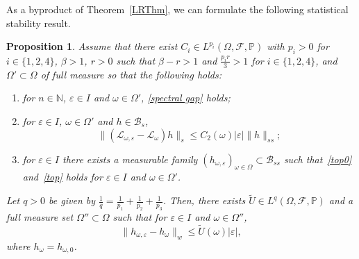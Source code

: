\documentclass[11pt,reqno,a4paper]{article}
\newtheorem{proposition}[theorem]{Proposition}
\theoremstyle{special}
\renewcommand{\epsilon}{\varepsilon}
\renewcommand{\L}{\mathcal{L}}
\def\N{\mathbb{N}}
\def\B{\mathcal{B}}
\begin{document}
$$
$$

As a byproduct of Theorem~\ref{LRThm}, we can formulate the following statistical stability result.
\begin{proposition}\label{Stab Prop}
Assume that there exist $C_i\in L^{p_i}(\Omega, \mathcal F, \mathbb P)$ with $p_i>0$ for $i\in \{ 1, 2,  4\}$,  $\beta >1$, $r>0$ such that $\beta -r>1$ and $\frac{p_ir}{3}>1$ for $i\in \{1, 2, 4\}$, and $\Omega'\subset \Omega$ of full measure so that the following holds:
\begin{enumerate}
\item for $n\in \N$, $\epsilon \in I$ and $\omega \in \Omega'$, \eqref{spectral gap} holds;
\item for $\epsilon \in I$, $\omega \in \Omega'$ and $h\in \B_{s}$, 
\begin{equation}\label{tn11}
\|(\L_{\omega, \epsilon}-\L_\omega)h\|_s \le C_2(\omega)|\epsilon| \|h\|_{ss};
\end{equation}
\item for $\epsilon \in I$ there exists a measurable family $(h_{\omega, \epsilon})_{\omega \in \Omega}\subset \B_{ss}$ such that~\eqref{top0} and~\eqref{top} holds for $\epsilon \in I$ and $\omega \in \Omega'$.
\end{enumerate}
Let $q>0$ be given by $\frac 1 q=\frac{1}{p_1}+\frac{1}{p_2}+\frac{1}{p_3}$. Then, there exists $\tilde U\in L^q(\Omega, \mathcal F, \mathbb P)$ and a full measure set $\Omega''\subset \Omega$ such that for $\epsilon \in I$ and $\omega \in \Omega''$,
\[
\|h_{\omega, \epsilon}-h_\omega \|_w \le \tilde U(\omega)| \epsilon|,
\]
where $h_\omega=h_{\omega,0}$.
\end{proposition}
\end{document}
